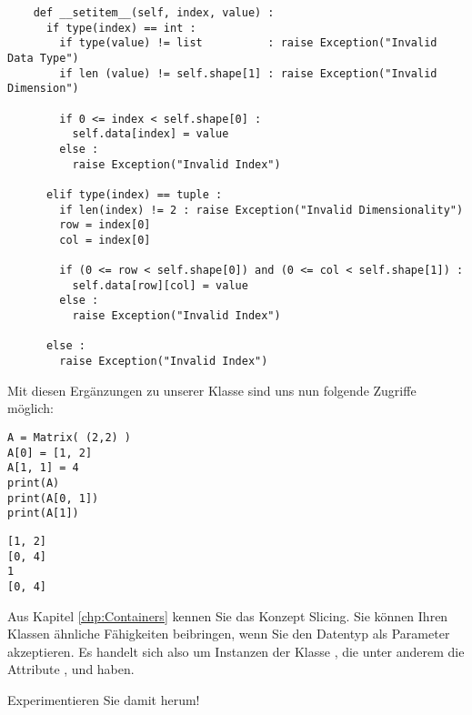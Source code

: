 \begin{codebox}
\begin{verbatim}
    def __setitem__(self, index, value) :
      if type(index) == int :
        if type(value) != list          : raise Exception("Invalid Data Type")
        if len (value) != self.shape[1] : raise Exception("Invalid Dimension")
        
        if 0 <= index < self.shape[0] :
          self.data[index] = value
        else :
          raise Exception("Invalid Index")
        
      elif type(index) == tuple :
        if len(index) != 2 : raise Exception("Invalid Dimensionality")
        row = index[0]
        col = index[0]
        
        if (0 <= row < self.shape[0]) and (0 <= col < self.shape[1]) :
          self.data[row][col] = value
        else :
          raise Exception("Invalid Index")
        
      else :
        raise Exception("Invalid Index")
\end{verbatim}
\end{codebox}

Mit diesen Ergänzungen zu unserer Klasse sind uns nun folgende Zugriffe möglich:
\begin{codebox}
\begin{verbatim}
A = Matrix( (2,2) )
A[0] = [1, 2]
A[1, 1] = 4
print(A)
print(A[0, 1])
print(A[1])
\end{verbatim}
\end{codebox}

\begin{cmdbox}
\begin{verbatim}
[1, 2]
[0, 4]
1
[0, 4]
\end{verbatim}
\end{cmdbox}

\begin{hintbox}[Slices]
Aus Kapitel \ref{chp:Containers} kennen Sie das Konzept Slicing. Sie können Ihren Klassen ähnliche Fähigkeiten beibringen, wenn Sie den Datentyp  als Parameter akzeptieren. Es handelt sich also um Instanzen der Klasse , die unter anderem die Attribute ,  und  haben.

Experimentieren Sie damit herum!
\end{hintbox}

